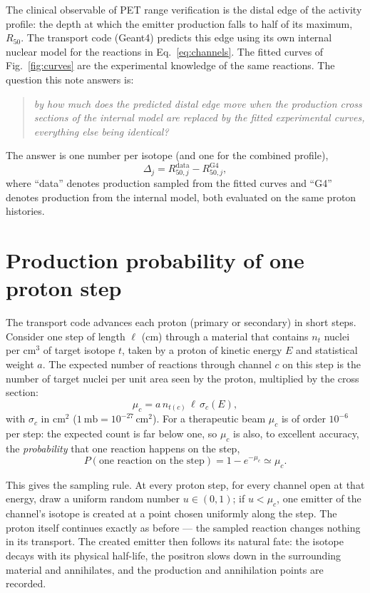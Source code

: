 \documentclass[11pt]{article}
\begin{document}
The clinical observable of PET range verification is the distal edge of the
activity profile: the depth at which the emitter production falls to half of
its maximum, $R_{50}$.  The transport code (Geant4) predicts this edge using
its own internal nuclear model for the reactions in
Eq.~\eqref{eq:channels}.  The fitted curves of Fig.~\ref{fig:curves} are the
experimental knowledge of the same reactions.  The question this note
answers is:
\begin{quote}
\emph{by how much does the predicted distal edge move when the production
cross sections of the internal model are replaced by the fitted experimental
curves, everything else being identical?}
\end{quote}
The answer is one number per isotope (and one for the combined profile),
\begin{equation}
  \Delta_j = R_{50,j}^{\mathrm{data}} - R_{50,j}^{\mathrm{G4}},
  \label{eq:delta}
\end{equation}
where ``data'' denotes production sampled from the fitted curves and ``G4''
denotes production from the internal model, both evaluated on the same proton
histories.

\section{Production probability of one proton step}

The transport code advances each proton (primary or secondary) in short
steps.  Consider one step of length $\ell$ (cm) through a material that
contains $n_t$ nuclei per cm$^3$ of target isotope $t$, taken by a proton of
kinetic energy $E$ and statistical weight $a$.  The expected number of
reactions through channel $c$ on this step is the number of target nuclei per
unit area seen by the proton, multiplied by the cross section:
\begin{equation}
  \mu_{c} = a\, n_{t(c)}\,\ell\,\sigma_c(E),
  \label{eq:mu}
\end{equation}
with $\sigma_c$ in cm$^2$ ($1~\mathrm{mb} = 10^{-27}\,\mathrm{cm}^2$).  For a
therapeutic beam $\mu_c$ is of order $10^{-6}$ per step: the expected count
is far below one, so $\mu_c$ is also, to excellent accuracy, the
\emph{probability} that one reaction happens on the step,
\begin{equation}
  P(\text{one reaction on the step}) = 1 - e^{-\mu_c} \simeq \mu_c .
  \label{eq:bernoulli}
\end{equation}

This gives the sampling rule.  At every proton step, for every channel open
at that energy, draw a uniform random number $u \in (0,1)$; if
$u < \mu_c$, one emitter of the channel's isotope is created at a point
chosen uniformly along the step.  The proton itself continues exactly as
before --- the sampled reaction changes nothing in its transport.  The
created emitter then follows its natural fate: the isotope decays with its
physical half-life, the positron slows down in the surrounding material and
annihilates, and the production and annihilation points are recorded.
\end{document}
